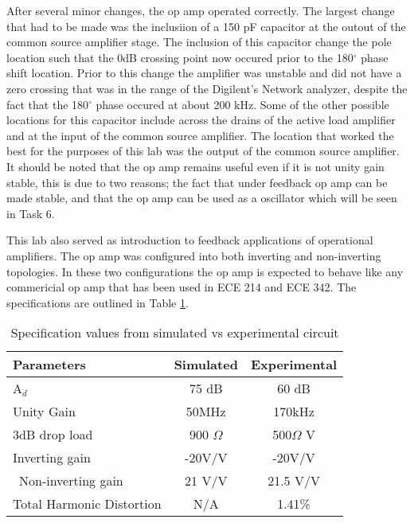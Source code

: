 
After several minor changes, the op amp operated correctly. The largest change that had to be made was the inclusiion of a 150 pF capacitor at the outout of the common source amplifier stage. The inclusion of this capacitor change the pole location such that the 0dB crossing point now occured prior to the 180$^\circ$ phase shift location. Prior to this change the amplifier was unstable and did not have a zero crossing that was in the range of the Digilent's Network analyzer, despite the fact that the 180$^\circ$ phase occured at about 200 kHz. Some of the other possible locations for this capacitor include across the drains of the active load amplifier and at the input of the common source amplifier. The location that worked the best for the purposes of this lab was the output of the common source amplifier. It should be noted that the op amp remains useful even if it is not unity gain stable, this is due to two reasons; the fact that under feedback op amp can be made stable, and that the op amp can be used as a oscillator which will be seen in Task 6. 

 This lab also served as introduction to feedback applications of operational amplifiers. The op amp was configured into both inverting and non-inverting topologies. In these two configurations the op amp is expected to behave like any commericial op amp that has been used in ECE 214 and ECE 342. The specifications are outlined in Table \ref{tab:specs}.

\begin{table}[H]
	\centering
	\caption{Specification values from simulated vs experimental circuit}
	\label{tab:specs}
	\begin{tabular}{|l|c|c|} 
		\hline                      
		\textbf{Parameters} & Simulated & Experimental        \\ \hline
		A$_{d}$ & 75 dB      & 60 dB                                      \\ \hline
		Unity Gain &    50MHz      & 170kHz                    	   \\ \hline
		3dB drop load & 900 $\Omega$         & 500$\Omega$ V                              	       	       \\ \hline
		Inverting gain  & -20V/V                       &  -20V/V                        	   \\ \hline\
	Non-inverting gain & 21 V/V				& 21.5 V/V 	 \\ \hline
		Total Harmonic Distortion           & N/A         &    1.41\%                            \\ \hline
	

	\end{tabular}
\end{table}

